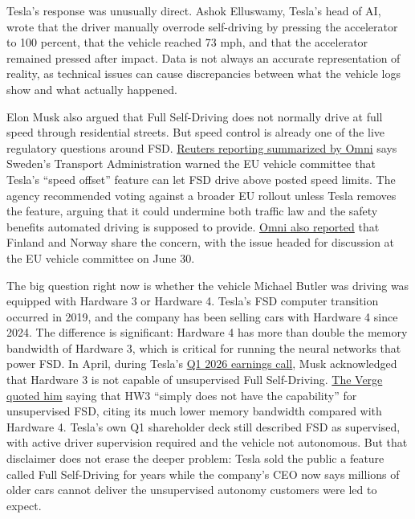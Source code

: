 \documentclass{news}
\begin{document}
Tesla's response was unusually direct. Ashok Elluswamy, Tesla's head of AI, wrote that the driver manually overrode self-driving by pressing the accelerator to 100 percent, that the vehicle reached 73 mph, and that the accelerator remained pressed after impact. Data is not always an accurate representation of reality, as technical issues can cause discrepancies between what the vehicle logs show and what actually happened.

Elon Musk also argued that Full Self-Driving does not normally drive at full speed through residential streets. But speed control is already one of the live regulatory questions around FSD. \href{https://omni.se/sverige-kan-saga-nej-till-teslas-sjalvkorning-i-eu-oro-for-fortkorning/a/lnO75k}{Reuters reporting summarized by Omni} says Sweden's Transport Administration warned the EU vehicle committee that Tesla's ``speed offset'' feature can let FSD drive above posted speed limits. The agency recommended voting against a broader EU rollout unless Tesla removes the feature, arguing that it could undermine both traffic law and the safety benefits automated driving is supposed to provide. \href{https://omni.se/sverige-larmar-om-funktion-i-teslas-sjalvkorning/a/WvolJk}{Omni also reported} that Finland and Norway share the concern, with the issue headed for discussion at the EU vehicle committee on June 30.

The big question right now is whether the vehicle Michael Butler was driving was equipped with Hardware 3 or Hardware 4. Tesla's FSD computer transition occurred in 2019, and the company has been selling cars with Hardware 4 since 2024. The difference is significant: Hardware 4 has more than double the memory bandwidth of Hardware 3, which is critical for running the neural networks that power FSD. In April, during Tesla's \href{https://ir.tesla.com/webcast-2026-04-22}{Q1 2026 earnings call}, Musk acknowledged that Hardware 3 is not capable of unsupervised Full Self-Driving. \href{https://www.theverge.com/transportation/917167/elon-musk-tesla-hw3-fsd}{The Verge quoted him} saying that HW3 ``simply does not have the capability'' for unsupervised FSD, citing its much lower memory bandwidth compared with Hardware 4. Tesla's own Q1 shareholder deck still described FSD as supervised, with active driver supervision required and the vehicle not autonomous. But that disclaimer does not erase the deeper problem: Tesla sold the public a feature called Full Self-Driving for years while the company's CEO now says millions of older cars cannot deliver the unsupervised autonomy customers were led to expect.
\end{document}
